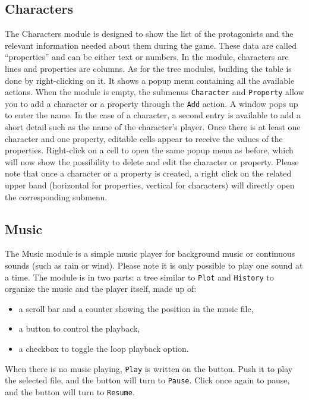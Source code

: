 \documentclass[a4paper,12pt]{article}
\newcommand*{\interfaceitem}[1]{\texttt{#1}}
\begin{document}
\subsection{Characters}
\label{sec:char}

The Characters module is designed to show the list of the protagonists and the relevant information needed about them during the game.
These data are called “properties” and can be either text or numbers. In the module, characters are lines and properties are columns.
As for the tree modules, building the table is done by right-clicking on it. It shows a popup menu containing all the available actions. When the module is empty, the submenus \interfaceitem{Character} and \interfaceitem{Property} allow you to add a character or a property through the \interfaceitem{Add} action. A window pops up to enter the name. In the case of a character, a second entry is available to add a short detail such as the name of the character’s player.
Once there is at least one character and one property, editable cells appear to receive the values of the properties. Right-click on a cell to open the same popup menu as before, which will now show the possibility to delete and edit the character or property. 
Please note that once a character or a property is created, a right click on the related upper band  (horizontal for properties, vertical for characters) will directly open the corresponding submenu.


\subsection{Music}
\label{sec:music}

The Music module is a simple music player for background music or continuous sounds (such as rain or wind). Please note it is only possible to play one sound at a time.
The module is in two parts: a tree similar to \interfaceitem{Plot} and \interfaceitem{History} to organize the music and the player itself, made up of:

\begin{itemize}
    \item a scroll bar and a counter showing the position in the music file,
    \item a button to control the playback,
    \item a checkbox to toggle the loop playback option.
\end{itemize}
When there is no music playing, \interfaceitem{Play} is written on the button. Push it to play the selected file, and the button will turn to \interfaceitem{Pause}. Click once again to pause, and the button will turn to \interfaceitem{Resume}.
\end{document}
